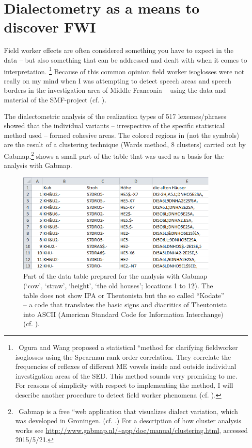 \documentclass[output=paper]{LSP/langsci}
\begin{document}
\section{Dialectometry as a means to discover FWI}
Field worker effects are often considered something you have to expect in the data – but also something that can be addressed and dealt with when it comes to interpretation.
\footnote{\ Ogura and Wang proposed a statistical ``method for clarifying fieldworker isoglosses{\textquotedbl} using the Spearman rank order correlation. They correlate the frequencies of reflexes of different ME vowels inside and outside individual investigation areas of the SED. This method sounds very promising to me. For reasons of simplicity with respect to implementing the method, I will describe another procedure to detect field worker phenomena (cf. \citealt{ogura_isoglosses_1992}).}
Because of this common opinion field worker isoglosses were not really on my mind when I was attempting to detect speech areas and speech borders in the investigation area of Middle Franconia – using the data and material of the SMF-project (cf. \citealt{mathussek_sprachraume_2014}).

The dialectometric analysis of the realization types of 517 lexemes/phrases showed that the individual variants – irrespective of the specific statistical method used – formed cohesive areas. The colored regions in  (not the symbols) are the result of a clustering technique (Ward{\textquotesingle}s method, 8 clusters) carried out by Gabmap.\footnote{\ Gabmap is a free ``web application that visualizes dialect variation{\textquotedbl}, which was developed in Groningen. (cf. \citealt{nerbonne_gabmap_2011}.) For a description of how cluster analysis works see \url{http://www.gabmap.nl/\~app/doc/manual/clustering.html}, accessed 2015/5/21.}  shows a small part of the table that was used as a basis for the analysis with Gabmap.

\begin{figure}
\includegraphics[width=0.9\textwidth]{illustrations/mathus_fig6}
\caption{Part of the data table prepared for the analysis with Gabmap (`cow', `straw', `height', `the old houses'; locations 1 to 12).
The table does not show IPA or Theutonista but the so called ``Kodate'' – a code that translates the basic signs and diacritics of Theutonista into ASCII (American Standard Code for Information Interchange) (cf. \citealt[38--40]{reichel_elektronische_2013}).}
\label{fig:6}
\end{figure}
\end{document}
